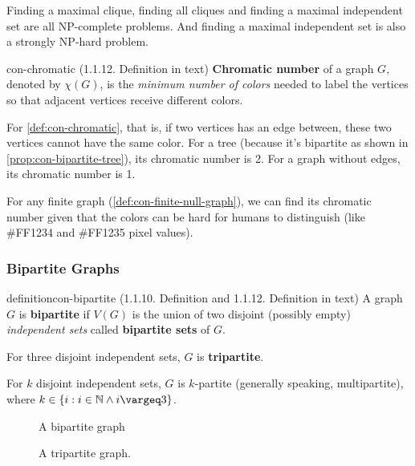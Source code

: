 \documentclass[../src/handouts/main.tex]{subfiles}
\begin{document}
Finding a maximal clique, finding all cliques and finding a maximal independent set are all NP-complete problems.
And finding a maximal independent set is also a strongly NP-hard problem.

\begin{definition}{}{con-chromatic}
  (1.1.12. Definition in text)
  \textbf{Chromatic number} of a graph $G$, denoted by $\chi (G)$, is the \textit{minimum number of colors} needed to label the vertices so that adjacent vertices receive different colors.
\end{definition}

For \cref{def:con-chromatic}, that is, if two vertices has an edge between, these two vertices cannot have the same color. For a tree (because it's bipartite as shown in \cref{prop:con-bipartite-tree}), its chromatic number is 2. For a graph without edges, its chromatic number is 1.

For any finite graph (\cref{def:con-finite-null-graph}), we can find its chromatic number given that the colors can be hard for humans to distinguish (like \#FF1234 and \#FF1235 pixel values).


\subsubsection{Bipartite Graphs}

\begin{recallable}{definition}{}{con-bipartite}
  (1.1.10. Definition and 1.1.12. Definition in text)
  A graph $G$ is \textbf{bipartite} if $V(G)$ is the union of two disjoint (possibly empty) \textit{independent sets} called \textbf{bipartite sets} of $G$.

  For three disjoint independent sets, $G$ is \textbf{tripartite}.

  For $k$ disjoint independent sets, $G$ is $k$-partite (generally speaking, multipartite), where $k \in \set{ i : i \in \N \land i \geq 3}$.
\end{recallable}

\begin{figure*}[htbp]
  \centering
  \begin{subfigure}{.4\textwidth}
    \centering
    \bipartitegraphwithlabels
    \caption{A bipartite graph}
    \label{fig:con-bipartite}
  \end{subfigure}
  \hspace{.1\textwidth}
  \begin{subfigure}{.4\textwidth}
    \centering
    \tripartitegraph
    \caption{A tripartite graph.}
    \label{fig:con-tripartite}
  \end{subfigure}
  \caption{Bipartite and tripartite graphs.}
  \label{fig:con-bipartite-tripartite}
\end{figure*}
\end{document}
